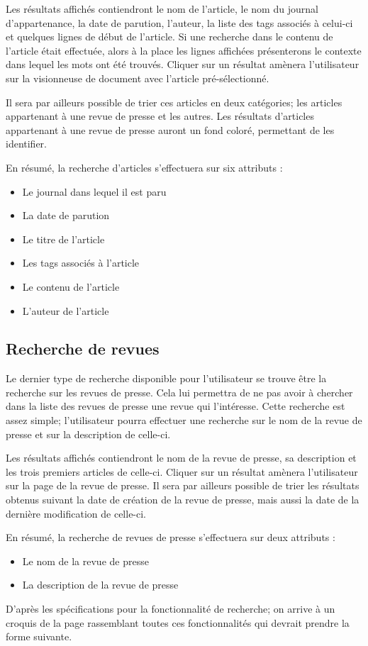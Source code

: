 Les résultats affichés contiendront le nom de l'article, le nom du journal d'appartenance, la date de parution, l'auteur, la liste des tags associés à celui-ci et quelques lignes de début de l'article. Si une recherche dans le contenu de l'article était effectuée, alors à la place les lignes affichées présenterons le contexte dans lequel les mots ont été trouvés. Cliquer sur un résultat amènera l'utilisateur sur la visionneuse de document avec l'article pré-sélectionné.

Il sera par ailleurs possible de trier ces articles en deux catégories; les articles appartenant à une revue de presse et les autres. Les résultats d'articles appartenant à une revue de presse auront un fond coloré, permettant de les identifier.

En résumé, la recherche d'articles s'effectuera sur six attributs :
\begin{itemize}
	\item Le journal dans lequel il est paru
	\item La date de parution
	\item Le titre de l'article
	\item Les tags associés à l'article
	\item Le contenu de l'article
	\item L'auteur de l'article
\end{itemize}

\subsection{Recherche de revues}
\label{sec:recherche_revue}

Le dernier type de recherche disponible pour l'utilisateur se trouve être la recherche sur les revues de presse. Cela lui permettra de ne pas avoir à chercher dans la liste des revues de presse une revue qui l'intéresse. Cette recherche est assez simple; l'utilisateur pourra effectuer une recherche sur le nom de la revue de presse et sur la description de celle-ci.

Les résultats affichés contiendront le nom de la revue de presse, sa description et les trois premiers articles de celle-ci. Cliquer sur un résultat amènera l'utilisateur sur la page de la revue de presse. Il sera par ailleurs possible de trier les résultats obtenus suivant la date de création de la revue de presse, mais aussi la date de la dernière modification de celle-ci.

En résumé, la recherche de revues de presse s'effectuera sur deux attributs :
\begin{itemize}
	\item Le nom de la revue de presse
	\item La description de la revue de presse
\end{itemize}
\bigskip
\par
D'après les spécifications pour la fonctionnalité de recherche; on arrive à un croquis de la page rassemblant toutes ces fonctionnalités qui devrait prendre la forme suivante.

